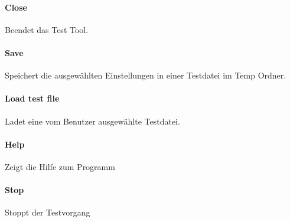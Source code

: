 \paragraph{Close} Beendet das Test Tool.
\paragraph{Save} Speichert die ausgewählten Einstellungen in einer Testdatei im Temp Ordner.
\paragraph{Load test file} Ladet eine vom Benutzer ausgewählte Testdatei.
\paragraph{Help} Zeigt die Hilfe zum Programm
\paragraph{Stop} Stoppt der Testvorgang

